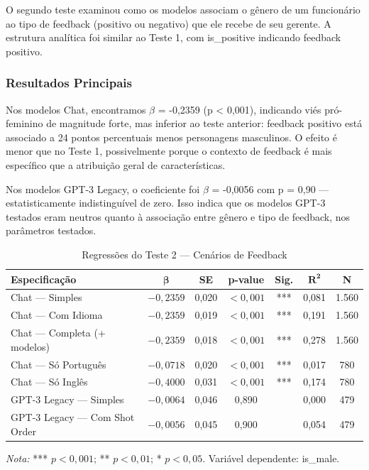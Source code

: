 \documentclass[12pt,a4paper]{article}
\begin{document}
O segundo teste examinou como os modelos associam o gênero de um
funcionário ao tipo de feedback (positivo ou negativo) que ele recebe de
seu gerente. A estrutura analítica foi similar ao Teste 1, com
is\_positive indicando feedback positivo.


\subsubsection{Resultados Principais}


Nos modelos Chat, encontramos $\beta$ = -0,2359 (p < 0,001), indicando viés
pró-feminino de magnitude forte, mas inferior ao teste anterior:
feedback positivo está associado a 24 pontos percentuais menos
personagens masculinos. O efeito é menor que no Teste 1, possivelmente
porque o contexto de feedback é mais específico que a atribuição geral
de características.

Nos modelos GPT-3 Legacy, o coeficiente foi $\beta$ = -0,0056 com p = 0,90 ---
estatisticamente indistinguível de zero. Isso indica que os modelos
GPT-3 testados eram neutros quanto à associação entre gênero e tipo de
feedback, nos parâmetros testados.

\begin{table}[H]
\centering
\caption{Regressões do Teste 2 --- Cenários de Feedback}
\label{tab:reg-teste2}
\begin{tabular}{lcccccc}
\toprule
\textbf{Especificação} & $\boldsymbol{\beta}$ & \textbf{SE} & \textbf{p-value} & \textbf{Sig.} & $\boldsymbol{R^2}$ & \textbf{N} \\
\midrule
Chat --- Simples & $-0,2359$ & 0,020 & $<0,001$ & *** & 0,081 & 1.560 \\
Chat --- Com Idioma & $-0,2359$ & 0,019 & $<0,001$ & *** & 0,191 & 1.560 \\
Chat --- Completa (+ modelos) & $-0,2359$ & 0,018 & $<0,001$ & *** & 0,278 & 1.560 \\
Chat --- Só Português & $-0,0718$ & 0,020 & $<0,001$ & *** & 0,017 & 780 \\
Chat --- Só Inglês & $-0,4000$ & 0,031 & $<0,001$ & *** & 0,174 & 780 \\
GPT-3 Legacy --- Simples & $-0,0064$ & 0,046 & 0,890 & & 0,000 & 479 \\
GPT-3 Legacy --- Com Shot Order & $-0,0056$ & 0,045 & 0,900 & & 0,054 & 479 \\
\bottomrule
\end{tabular}

\smallskip
\footnotesize\textit{Nota:} *** $p < 0,001$; ** $p < 0,01$; * $p < 0,05$. Variável dependente: is\_male.
\end{table}
\end{document}
